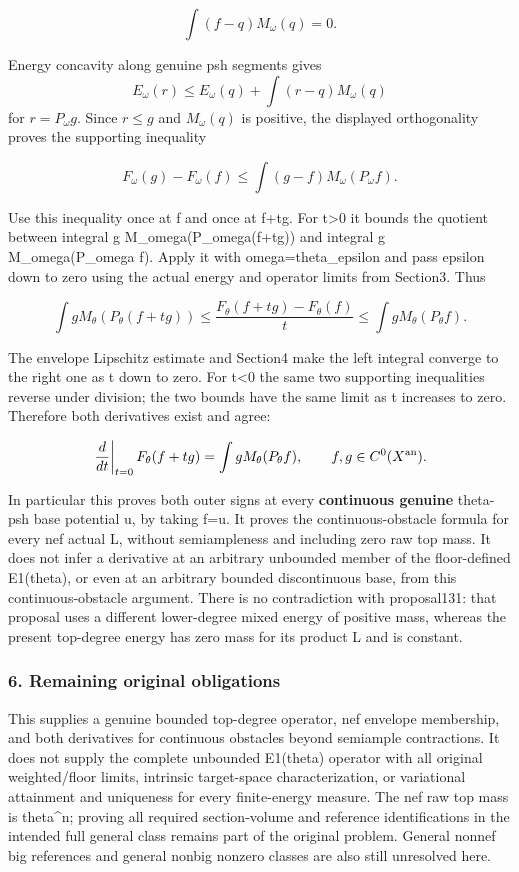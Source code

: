 \documentclass[
]{article}
\begin{document}
\[\int(f-q)M_\omega(q)=0.\]

Energy concavity along genuine psh segments gives
\[
 E_\omega(r)\le E_\omega(q)+\int(r-q)M_\omega(q)
\]
for \(r=P_\omega g\). Since \(r\le g\) and \(M_\omega(q)\) is positive, the displayed
orthogonality proves the supporting inequality

\[F_\omega(g)-F_\omega(f)\leq\int(g-f)M_\omega(P_\omega f).\]

Use this inequality once at f and once at f+tg. For t\textgreater0 it
bounds the quotient between integral g M\_omega(P\_omega(f+tg)) and
integral g M\_omega(P\_omega f). Apply it with omega=theta\_epsilon and
pass epsilon down to zero using the actual energy and operator limits
from Section3. Thus

\[\int gM_\theta(P_\theta(f+tg))\leq
\frac{F_\theta(f+tg)-F_\theta(f)}t\leq
\int gM_\theta(P_\theta f).\]

The envelope Lipschitz estimate and Section4 make the left integral
converge to the right one as t down to zero. For t\textless0 the same
two supporting inequalities reverse under division; the two bounds have
the same limit as t increases to zero. Therefore both derivatives exist
and agree:

\[\left.\frac{d}{dt}\right|_{t=0}F_\theta(f+tg)=\int gM_\theta(P_\theta f),\qquad f,g\in C^0(X^{\rm an}).\]

In particular this proves both outer signs at every \textbf{continuous
genuine} theta-psh base potential u, by taking f=u. It proves the
continuous-obstacle formula for every nef actual L, without
semiampleness and including zero raw top mass. It does not infer a
derivative at an arbitrary unbounded member of the floor-defined
E1(theta), or even at an arbitrary bounded discontinuous base, from this
continuous-obstacle argument. There is no contradiction with
proposal131: that proposal uses a different lower-degree mixed energy of
positive mass, whereas the present top-degree energy has zero mass for
its product L and is constant.

\subsubsection{6. Remaining original
obligations}\label{remaining-original-obligations}

This supplies a genuine bounded top-degree operator, nef envelope
membership, and both derivatives for continuous obstacles beyond
semiample contractions. It does not supply the complete unbounded
E1(theta) operator with all original weighted/floor limits, intrinsic
target-space characterization, or variational attainment and uniqueness
for every finite-energy measure. The nef raw top mass is theta\^{}n;
proving all required section-volume and reference identifications in the
intended full general class remains part of the original problem.
General nonnef big references and general nonbig nonzero classes are
also still unresolved here.
\end{document}
